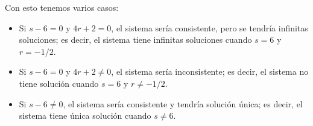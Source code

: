 \documentclass[12pt,a4]{aleph-examen}
\begin{document}
\begin{preguntas}
\begin{respuesta}
Con esto tenemos varios casos:

\begin{itemize}
\item
  Si \(s-6=0\) y \(4r+2=0\), el sistema sería consistente, pero se
  tendría infinitas soluciones; es decir, el sistema tiene infinitas
  soluciones cuando \(s=6\) y \(r=-1/2\).
\item
  Si \(s-6=0\) y \(4r+2\neq 0\), el sistema sería inconsistente; es
  decir, el sistema no tiene solución cuando \(s=6\) y \(r\neq -1/2\).
\item
  Si \(s-6\neq 0\), el sistema sería consistente y tendría solución
  única; es decir, el sistema tiene única solución cuando \(s\neq 6\).\qedhere
\end{itemize}

\end{respuesta}



\end{preguntas}
\end{document}
